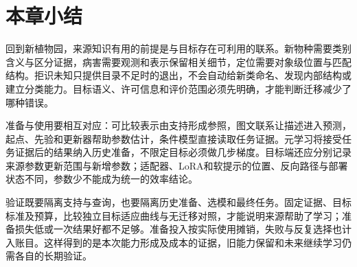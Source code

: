 \section{本章小结}
\label{sec:ket-transfer-summary}

回到新植物园，来源知识有用的前提是与目标存在可利用的联系。新物种需要类别含义与区分证据，病害需要观测和表示保留相关细节，定位需要对象级位置与匹配结构。拒识未知只提供目录不足时的退出，不会自动给新类命名、发现内部结构或建立分类能力。目标语义、许可信息和评价范围必须先明确，才能判断迁移减少了哪种错误。

准备与使用要相互对应：可比较表示由支持形成参照，图文联系让描述进入预测，起点、先验和更新器帮助参数估计，条件模型直接读取任务证据。元学习将接受任务证据后的结果纳入历史准备，不限定目标必须做几步梯度。目标端还应分别记录来源参数更新范围与新增参数；适配器、LoRA和软提示的位置、反向路径与部署状态不同，参数少不能成为统一的效率结论。

验证既要隔离支持与查询，也要隔离历史准备、选模和最终任务。固定证据、目标标准及预算，比较独立目标适应曲线与无迁移对照，才能说明来源帮助了学习；准备损失低或一次结果好都不足够。准备投入按实际使用摊销，失败与反复选择也计入账目。这样得到的是本次能力形成及成本的证据，旧能力保留和未来继续学习仍需各自的长期验证。
